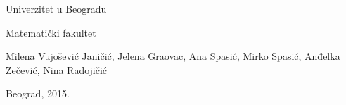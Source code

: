 \pagestyle{empty}

\begin{center}
{\sffamily

{\fontsize{16pt}{19pt}\selectfont Univerzitet u Beogradu}

{\fontsize{16pt}{19pt}\selectfont Matematički fakultet}
\vspace{70pt}

{\fontsize{16pt}{19pt}\selectfont Milena Vujošević Janičić, Jelena Graovac, Ana Spasić, Mirko Spasić, Anđelka Zečević, Nina Radojičić}

\vspace{50pt}
{\fontsize{22pt}{26pt}\selectfont {Programiranje 2 \\ Zbirka zadataka sa rešenjima}}

\vspace{120pt}


{\fontsize{14pt}{17pt}\selectfont Beograd, 2015.}
}
\end{center}

